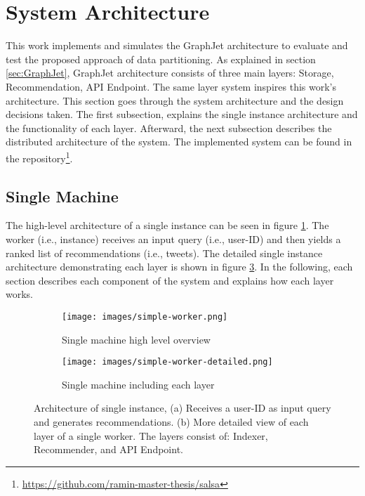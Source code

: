 \section{System Architecture}
\label{sec:system-architecture}

This work implements and simulates the GraphJet architecture to evaluate and test the proposed approach of data partitioning. As explained in section \ref{sec:GraphJet}, GraphJet architecture consists of three main layers: Storage, Recommendation, API Endpoint. The same layer system inspires this work's architecture. This section goes through the system architecture and the design decisions taken. The first subsection, explains the single instance architecture and the functionality of each layer. Afterward, the next subsection describes the distributed architecture of the system. The implemented system can be found in the repository\footnote{\url{https://github.com/ramin-master-thesis/salsa}}.


\subsection{Single Machine}
\label{subsec:single-machine}
The high-level architecture of a single instance can be seen in figure \ref{fig:single-machine-architecture}. The worker (i.e., instance) receives an input query (i.e., user-ID) and then yields a ranked list of recommendations (i.e., tweets). The detailed single instance architecture demonstrating each layer is shown in figure \ref{fig:single-machine-architecture-detailed}. In the following, each section describes each component of the system and explains how each layer works.

\begin{figure}[!h]
    \centering
    \begin{subfigure}[b]{0.75\textwidth}
       \texttt{[image: images/simple-worker.png]}
       \caption{Single machine high level overview}
       \label{fig:single-machine-architecture} 
    \end{subfigure}
    
    \begin{subfigure}[b]{0.8\textwidth}
       \texttt{[image: images/simple-worker-detailed.png]}
       \caption{Single machine including each layer}
       \label{fig:single-machine-architecture-detailed}
    \end{subfigure}
    
    \caption {Architecture of single instance, (a) Receives a user-ID as input query and generates recommendations. (b) More detailed view of each layer of a single worker. The layers consist of: Indexer, Recommender, and API Endpoint.}
\end{figure}



